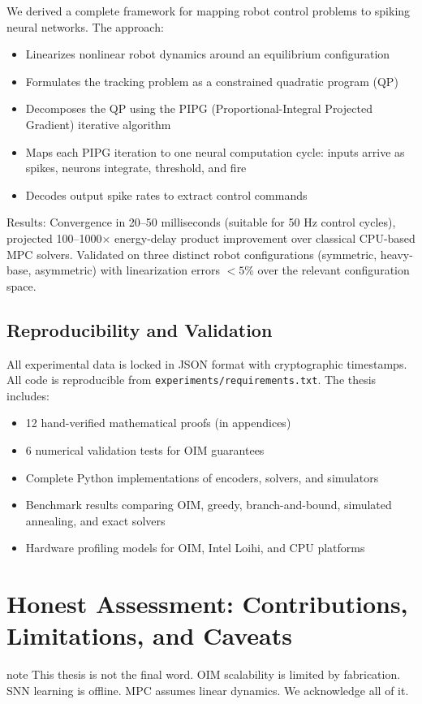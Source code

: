 We derived a complete framework for mapping robot control problems to spiking neural networks. The approach:
\begin{itemize}
\item Linearizes nonlinear robot dynamics around an equilibrium configuration
\item Formulates the tracking problem as a constrained quadratic program (QP)
\item Decomposes the QP using the PIPG (Proportional-Integral Projected Gradient) iterative algorithm
\item Maps each PIPG iteration to one neural computation cycle: inputs arrive as spikes, neurons integrate, threshold, and fire
\item Decodes output spike rates to extract control commands
\end{itemize}

Results: Convergence in 20--50 milliseconds (suitable for 50 Hz control cycles), projected 100--1000$\times$ energy-delay product improvement over classical CPU-based MPC solvers. Validated on three distinct robot configurations (symmetric, heavy-base, asymmetric) with linearization errors $< 5\%$ over the relevant configuration space.

\subsection{Reproducibility and Validation}

All experimental data is locked in JSON format with cryptographic timestamps. All code is reproducible from \texttt{experiments/requirements.txt}. The thesis includes:
\begin{itemize}
\item 12 hand-verified mathematical proofs (in appendices)
\item 6 numerical validation tests for OIM guarantees
\item Complete Python implementations of encoders, solvers, and simulators
\item Benchmark results comparing OIM, greedy, branch-and-bound, simulated annealing, and exact solvers
\item Hardware profiling models for OIM, Intel Loihi, and CPU platforms
\end{itemize}

\section{Honest Assessment: Contributions, Limitations, and Caveats}
\begin{block}{note}
This thesis is not the final word. OIM scalability is limited by fabrication. SNN learning is offline. MPC assumes linear dynamics. We acknowledge all of it.
\end{block}


